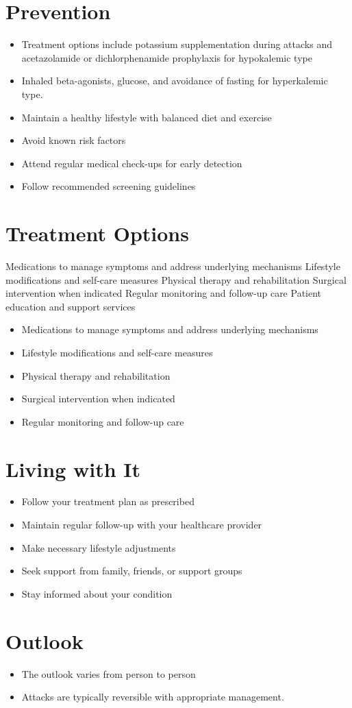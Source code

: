 \section{Prevention}
\begin{itemize}[noitemsep]
  \item Treatment options include potassium supplementation during attacks and acetazolamide or dichlorphenamide prophylaxis for hypokalemic type
  \item Inhaled beta-agonists, glucose, and avoidance of fasting for hyperkalemic type.
  \item Maintain a healthy lifestyle with balanced diet and exercise
  \item Avoid known risk factors
  \item Attend regular medical check-ups for early detection
  \item Follow recommended screening guidelines
\end{itemize}
\section{Treatment Options}
Medications to manage symptoms and address underlying mechanisms Lifestyle modifications and self-care measures Physical therapy and rehabilitation Surgical intervention when indicated Regular monitoring and follow-up care Patient education and support services

\begin{itemize}[noitemsep]
  \item Medications to manage symptoms and address underlying mechanisms
  \item Lifestyle modifications and self-care measures
  \item Physical therapy and rehabilitation
  \item Surgical intervention when indicated
  \item Regular monitoring and follow-up care
\end{itemize}
\section{Living with It}
\begin{itemize}[noitemsep]
  \item Follow your treatment plan as prescribed
  \item Maintain regular follow-up with your healthcare provider
  \item Make necessary lifestyle adjustments
  \item Seek support from family, friends, or support groups
  \item Stay informed about your condition
\end{itemize}
\section{Outlook}
\begin{itemize}[noitemsep]
  \item The outlook varies from person to person
  \item Attacks are typically reversible with appropriate management.
\end{itemize}

